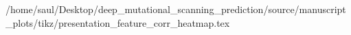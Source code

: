 /home/saul/Desktop/deep_mutational_scanning_prediction/source/manuscript_plots/tikz/presentation_feature_corr_heatmap.tex